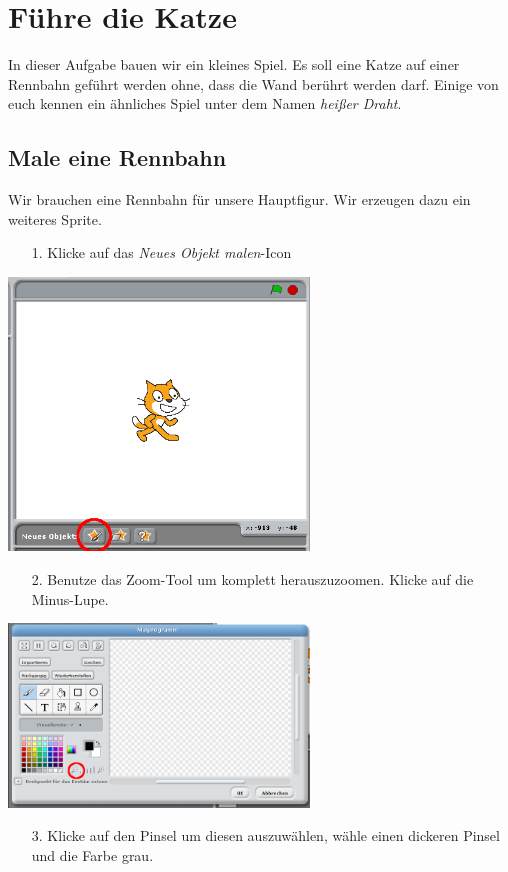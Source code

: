 \section{Führe die Katze}
In dieser Aufgabe bauen wir ein kleines Spiel. Es soll eine Katze auf einer Rennbahn geführt werden ohne, dass die Wand berührt werden darf. Einige von euch kennen ein ähnliches Spiel unter dem Namen \emph{heißer Draht}.
\subsection{Male eine Rennbahn}
Wir brauchen eine Rennbahn für unsere Hauptfigur. Wir erzeugen dazu ein weiteres Sprite.
\begin{itemize}
\item[1. ] Klicke auf das \textit{Neues Objekt malen}-Icon
\end{itemize}
\includegraphics[width=0.6\textwidth]{images/aufgabe4_neues_objekt_malen.png}
\begin{itemize}
\item[2. ] Benutze das Zoom-Tool um komplett herauszuzoomen. Klicke auf die Minus-Lupe.
\end{itemize}
\includegraphics[width=0.6\textwidth]{images/aufgabe4_zoom.png}
\begin{itemize}
\item[3. ] Klicke auf den Pinsel um diesen auszuwählen, wähle einen dickeren Pinsel und die Farbe grau.
\end{itemize}
